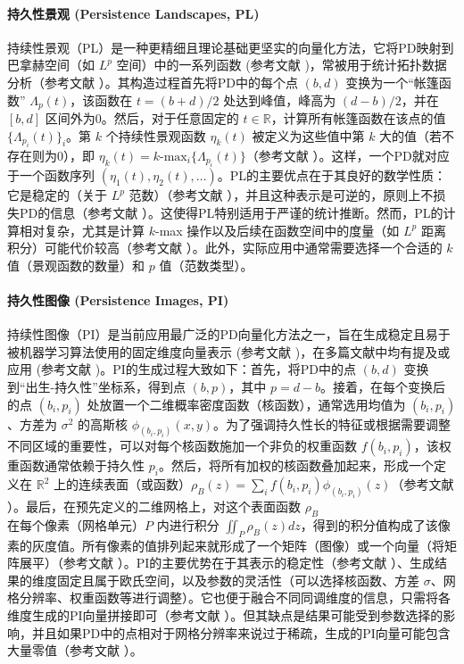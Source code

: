            \paragraph{持久性景观 (Persistence Landscapes, PL)}
                \label{sec:feat_pl}
                持续性景观（PL）是一种更精细且理论基础更坚实的向量化方法，它将PD映射到巴拿赫空间（如 $L^p$ 空间）中的一系列函数 (参考文献 \cite{source:16, source:586})，常被用于统计拓扑数据分析（参考文献 \cite{source:334, source:368, source:527}）。其构造过程首先将PD中的每个点 $(b, d)$ 变换为一个“帐篷函数” $\Lambda_p(t)$，该函数在 $t = (b+d)/2$ 处达到峰值，峰高为 $(d-b)/2$，并在 $[b, d]$ 区间外为0。然后，对于任意固定的 $t \in \mathbb{R}$，计算所有帐篷函数在该点的值 $\{\Lambda_{p_i}(t)\}_{i}$。第 $k$ 个持续性景观函数 $\eta_k(t)$ 被定义为这些值中第 $k$ 大的值（若不存在则为0），即 $\eta_k(t) = k\text{-max}_i \{\Lambda_{p_i}(t)\}$（参考文献 \cite{source:61}）。这样，一个PD就对应于一个函数序列 $(\eta_1(t), \eta_2(t), \dots)$。PL的主要优点在于其良好的数学性质：它是稳定的（关于 $L^p$ 范数）（参考文献 \cite{source:100}），并且这种表示是可逆的，原则上不损失PD的信息（参考文献 \cite{source:18}）。这使得PL特别适用于严谨的统计推断。然而，PL的计算相对复杂，尤其是计算 $k$-max 操作以及后续在函数空间中的度量（如 $L^p$ 距离积分）可能代价较高（参考文献 \cite{source:16, source:88}）。此外，实际应用中通常需要选择一个合适的 $k$ 值（景观函数的数量）和 $p$ 值（范数类型）。

            \paragraph{持久性图像 (Persistence Images, PI)}
                \label{sec:feat_pi}
                持续性图像（PI）是当前应用最广泛的PD向量化方法之一，旨在生成稳定且易于被机器学习算法使用的固定维度向量表示 (参考文献 \cite{source:17, source:595})，在多篇文献中均有提及或应用 (参考文献 \cite{source:29, source:88, source:334, source:370, source:527})。PI的生成过程大致如下：首先，将PD中的点 $(b, d)$ 变换到“出生-持久性”坐标系，得到点 $(b, p)$，其中 $p = d-b$。接着，在每个变换后的点 $(b_i, p_i)$ 处放置一个二维概率密度函数（核函数），通常选用均值为 $(b_i, p_i)$、方差为 $\sigma^2$ 的高斯核 $\phi_{(b_i, p_i)}(x, y)$。为了强调持久性长的特征或根据需要调整不同区域的重要性，可以对每个核函数施加一个非负的权重函数 $f(b_i, p_i)$，该权重函数通常依赖于持久性 $p_i$。然后，将所有加权的核函数叠加起来，形成一个定义在 $\mathbb{R}^2$ 上的连续表面（或函数）$\rho_{B}(z) = \sum_i f(b_i, p_i) \phi_{(b_i, p_i)}(z)$（参考文献 \cite{source:64}）。最后，在预先定义的二维网格上，对这个表面函数 $\rho_B$ 在每个像素（网格单元）$P$ 内进行积分 $\iint_P \rho_B(z) dz$，得到的积分值构成了该像素的灰度值。所有像素的值排列起来就形成了一个矩阵（图像）或一个向量（将矩阵展平）（参考文献 \cite{source:65}）。PI的主要优势在于其表示的稳定性（参考文献 \cite{source:17, source:253}）、生成结果的维度固定且属于欧氏空间，以及参数的灵活性（可以选择核函数、方差 $\sigma$、网格分辨率、权重函数等进行调整）。它也便于融合不同同调维度的信息，只需将各维度生成的PI向量拼接即可（参考文献 \cite{source:65}）。但其缺点是结果可能受到参数选择的影响，并且如果PD中的点相对于网格分辨率来说过于稀疏，生成的PI向量可能包含大量零值（参考文献 \cite{source:88}）。

